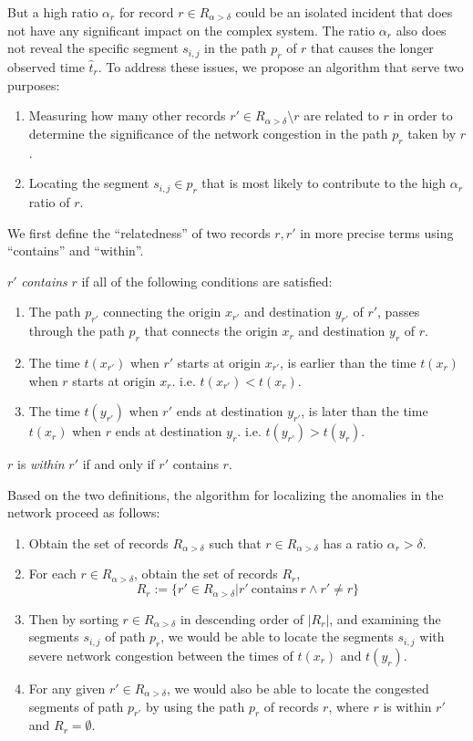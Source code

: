 \documentclass{sig-alternate}
\begin{document}
But a high ratio $\alpha_r$ for record $r \in R_{\alpha > \delta}$ could be an isolated incident that does not have any significant impact on the complex system. The ratio $\alpha_r$ also does not reveal the specific segment $s_{i,j}$ in the path $p_r$ of $r$ that causes the longer observed time $\hat{t}_r$. To address these issues, we propose an algorithm that serve two purposes:
\begin{enumerate}
	\item Measuring how many other records $r' \in R_{\alpha > \delta}\setminus{r}$ are related to $r$ in order to determine the significance of the network congestion in the path $p_r$ taken by $r$.
	\item Locating the segment $s_{i,j} \in p_r$ that is most likely to contribute to the high $\alpha_r$ ratio of $r$.
\end{enumerate}
We first define the ``relatedness'' of two records $r, r'$ in more precise terms using ``contains'' and ``within''.
\begin{definition}
	$r'$ \emph{contains} $r$ if all of the following conditions are satisfied: 
	\begin{enumerate}
		\item The path $p_{r'}$ connecting the origin $x_{r'}$ and destination $y_{r'}$ of $r'$, passes through the path $p_{r}$ that connects the origin $x_{r}$ and destination $y_{r}$ of $r$. 
		\item The time $t(x_{r'})$ when $r'$ starts at origin $x_{r'}$, is earlier than the time $t(x_{r})$ when $r$ starts at origin $x_{r}$. i.e. $t(x_{r'}) < t(x_{r})$.
		\item The time $t(y_{r'})$ when $r'$ ends at destination $y_{r'}$, is later than the time $t(x_{r})$ when $r$ ends at destination $y_{r}$. i.e. $t(y_{r'}) > t(y_{r})$.
	\end{enumerate}
\end{definition}
\begin{definition}
	$r$ is \emph{within} $r'$ if and only if $r'$ contains $r$.
\end{definition}
Based on the two definitions, the algorithm for localizing the anomalies in the network proceed as follows:
\begin{enumerate}
	\item Obtain the set of records $R_{\alpha > \delta}$ such that $r \in R_{\alpha > \delta}$ has a ratio $\alpha_r > \delta$.
	\item For each $r \in R_{\alpha > \delta}$, obtain the set of records $R_r$,
	\[ R_{r} := \{ r' \in R_{\alpha > \delta} | r' ~ \text{contains} ~ r \land r' \neq r \} \]
	\item Then by sorting $r \in R_{\alpha > \delta}$ in descending order of $|R_r|$, and examining the segments $s_{i,j}$ of path $p_r$, we would be able to locate the segments $s_{i,j}$ with severe network congestion between the times of $t(x_r)$ and $t(y_r)$.
	\item For any given $r' \in R_{\alpha > \delta}$, we would also be able to locate the congested segments of path $p_{r'}$ by using the path $p_r$ of records $r$, where $r$ is within $r'$ and $R_r = \emptyset$.
\end{enumerate}
\end{document}

